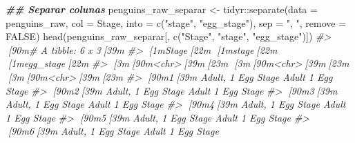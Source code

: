 \documentclass[
]{book}
\newenvironment{Shaded}{\begin{snugshade}}{\end{snugshade}}
\newcommand{\AttributeTok}[1]{\textcolor[rgb]{0.61,0.61,0.61}{#1}}
\newcommand{\CommentTok}[1]{\textcolor[rgb]{0.37,0.37,0.37}{\textit{#1}}}
\newcommand{\ConstantTok}[1]{\textcolor[rgb]{0,0,0}{#1}}
\newcommand{\DocumentationTok}[1]{\textcolor[rgb]{0.37,0.37,0.37}{\textbf{\textit{#1}}}}
\newcommand{\FunctionTok}[1]{\textcolor[rgb]{0,0,0}{#1}}
\newcommand{\NormalTok}[1]{#1}
\newcommand{\OtherTok}[1]{\textcolor[rgb]{0.37,0.37,0.37}{#1}}
\newcommand{\SpecialCharTok}[1]{\textcolor[rgb]{0,0,0}{#1}}
\newcommand{\StringTok}[1]{\textcolor[rgb]{0.5,0.5,0.5}{#1}}
\begin{document}
\begin{Shaded}
\begin{Highlighting}[]
\DocumentationTok{\#\# Separar colunas}
\NormalTok{penguins\_raw\_separar }\OtherTok{\textless{}{-}}\NormalTok{ tidyr}\SpecialCharTok{::}\FunctionTok{separate}\NormalTok{(}\AttributeTok{data =}\NormalTok{ penguins\_raw, }
                                        \AttributeTok{col =}\NormalTok{ Stage,}
                                        \AttributeTok{into =} \FunctionTok{c}\NormalTok{(}\StringTok{"stage"}\NormalTok{, }\StringTok{"egg\_stage"}\NormalTok{), }
                                        \AttributeTok{sep =} \StringTok{", "}\NormalTok{,}
                                        \AttributeTok{remove =} \ConstantTok{FALSE}\NormalTok{)}
\FunctionTok{head}\NormalTok{(penguins\_raw\_separar[, }\FunctionTok{c}\NormalTok{(}\StringTok{"Stage"}\NormalTok{, }\StringTok{"stage"}\NormalTok{, }\StringTok{"egg\_stage"}\NormalTok{)])}
\CommentTok{\#\textgreater{} [90m\# A tibble: 6 x 3[39m}
\CommentTok{\#\textgreater{}   [1mStage[22m              [1mstage[22m [1megg\_stage[22m  }
\CommentTok{\#\textgreater{}   [3m[90m\textless{}chr\textgreater{}[39m[23m              [3m[90m\textless{}chr\textgreater{}[39m[23m [3m[90m\textless{}chr\textgreater{}[39m[23m      }
\CommentTok{\#\textgreater{} [90m1[39m Adult, 1 Egg Stage Adult 1 Egg Stage}
\CommentTok{\#\textgreater{} [90m2[39m Adult, 1 Egg Stage Adult 1 Egg Stage}
\CommentTok{\#\textgreater{} [90m3[39m Adult, 1 Egg Stage Adult 1 Egg Stage}
\CommentTok{\#\textgreater{} [90m4[39m Adult, 1 Egg Stage Adult 1 Egg Stage}
\CommentTok{\#\textgreater{} [90m5[39m Adult, 1 Egg Stage Adult 1 Egg Stage}
\CommentTok{\#\textgreater{} [90m6[39m Adult, 1 Egg Stage Adult 1 Egg Stage}


\end{Highlighting}
\end{Shaded}
\end{document}
